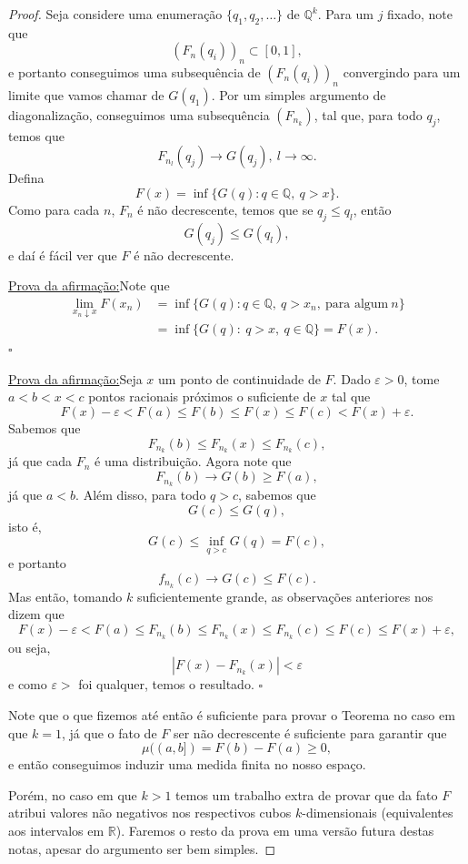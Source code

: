 \documentclass[12pt,a4paper,oneside]{book}
\newenvironment{claim}[1]{\par\noindent\underline{Afirma\c{c}\~ao:}\space#1}{}
\newenvironment{claimproof}[1]{\par\noindent\underline{Prova da afirma\c{c}\~ao:}\space#1}{\hfill $\square$}
\theoremstyle{definition}
\theoremstyle{remark}
\numberwithin{equation}{section}
\newcommand{\R}{\mathbb{R}}
\newcommand{\e}{\varepsilon}
\begin{document}
\begin{proof}
Seja considere uma enumeração $\{q_1,q_2,\dots\}$ de $\mathbb{Q}^k$. 
Para um $j$ fixado, note que
$$(F_n(q_i))_n\subset [0,1],$$
e portanto conseguimos uma subsequência de $(F_n(q_i))_n$ convergindo para um limite que vamos chamar de $G(q_1)$. Por um simples argumento de diagonalização, conseguimos uma subsequência $(F_{n_k})$, tal que, para todo $q_j$, temos que
$$F_{n_l}(q_j) \rightarrow G(q_j),\ l\rightarrow \infty. $$
Defina
$$F(x) = \inf \{ G(q): q\in \mathbb{Q},\ q>x\}.  $$
Como para cada $n$, $F_n$ é não decrescente, temos que se $q_j\leq q_l$, então 
$$G(q_j)\leq G(q_l), $$
e daí é fácil ver que $F$ é não decrescente.
\bigskip
{}
\begin{claimproof}
Note que 
\begin{align*}
\lim_{x_n\downarrow x} F(x_n) &= \inf\{ G(q): q\in \mathbb{Q},\ q>x_n,\ \textrm{para algum}\ n\}\\
&= \inf\{ G(q): \ q>x,\  q\in \mathbb{Q}\} = F(x).
\end{align*}
\end{claimproof}
\bigskip
{}
\begin{claimproof}
Seja $x$ um ponto de continuidade de $F$. Dado $\e>0$, tome $a<b<x<c$ pontos racionais próximos o suficiente de $x$ tal que
$$F(x)-\e < F(a)\leq F(b)\leq F(x)\leq F(c)< F(x)+\e .$$
Sabemos que
$$F_{n_k}(b)\leq F_{n_k}(x)\leq F_{n_k}(c), $$
já que cada $F_n$ é uma distribuição. Agora note que
$$F_{n_k}(b) \rightarrow G(b) \geq F(a),$$
já que $a<b$. Além disso,  para todo $q>c$, sabemos que
$$ G(c)\leq G(q),$$
isto é,
$$G(c)\leq \inf_{q>c}G(q)  = F(c), $$
e portanto
$$f_{n_k}(c)\rightarrow G(c)\leq F(c). $$
Mas então, tomando $k$ suficientemente grande, as observações anteriores nos dizem que
$$ F(x)-\e <F(a)\leq F_{n_k}(b)\leq F_{n_k}(x)\leq F_{n_k}(c)\leq F(c)\leq F(x)+\e,  $$
ou seja,
$$|F(x)-F_{n_k}(x)|<\e $$
e como $\e>$ foi qualquer, temos o resultado.
\end{claimproof}


Note que o que fizemos até então é suficiente para provar o Teorema no caso em que $k=1$, já que o fato de $F$ ser não decrescente é suficiente para garantir que
$$\mu((a,b]) = F(b)-F(a)\geq 0, $$
e então conseguimos induzir uma medida finita no nosso espaço.

Porém, no caso em que $k>1$ temos um trabalho extra de provar que da fato $F$ atribui valores não negativos nos respectivos cubos $k$-dimensionais (equivalentes aos intervalos em $\R$). Faremos o resto da prova em uma versão futura destas notas, apesar do argumento ser bem simples.

\end{proof}
\end{document}
